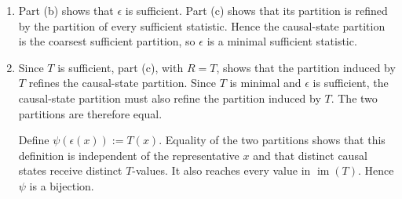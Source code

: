 \documentclass[11pt]{article}
\begin{document}
\begin{solution}[ex:p2-2]
\begin{enumerate}
        Thus any two histories in the same cell induced by $R$ also lie in the
        same causal state. Every cell induced by $R$ is therefore contained in
        a causal state, so the partition induced by $R$ refines the
        causal-state partition. Since $R$ was arbitrary, every sufficient
        partition has this property.

      \item Part (b) shows that $\epsilon$ is sufficient. Part (c) shows that
        its partition is refined by the partition of every sufficient
        statistic. Hence the causal-state partition is the coarsest sufficient
        partition, so $\epsilon$ is a minimal sufficient statistic.

      \item Since $T$ is sufficient, part (c), with $R=T$, shows that the
        partition induced by $T$ refines the causal-state partition. Since
        $T$ is minimal and $\epsilon$ is sufficient, the causal-state
        partition must also refine the partition induced by $T$. The two
        partitions are therefore equal.

        Define $\psi(\epsilon(x)):=T(x)$. Equality of the two partitions shows
        that this definition is independent of the representative $x$ and
        that distinct causal states receive distinct $T$-values. It also
        reaches every value in $\operatorname{im}(T)$. Hence $\psi$ is a
        bijection.
    \end{enumerate}
\end{solution}
\end{document}
